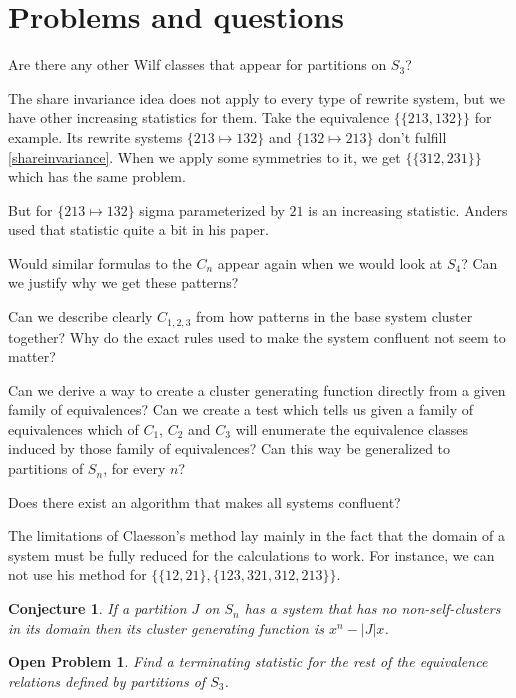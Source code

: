 \documentclass[a4paper, 11pt, english]{article}
\newcommand{\patternrule}{ \mapsto \!}
\newtheorem{openproblem}[theorem]{Open Problem}
\newtheorem{conjecture}[theorem]{Conjecture}
\theoremstyle{definition}
\newcommand{\Sym}{S}
\begin{document}
\section{Problems and questions}

Are there any other Wilf classes that appear for partitions on $\Sym_3$?

The share invariance idea does not apply to every type of rewrite system, but we
have other increasing statistics for them. Take the equivalence $\{ \{ 213, 132
\} \}$ for example. Its rewrite systems ${\{ 213 \patternrule 132 \}}$ and ${\{
132 \patternrule 213 \}}$ don't fulfill \eqref{shareinvariance}. When we
apply some symmetries to it, we get $\{ \{ 312, 231 \} \}$ which has the same
problem.

But for $\{ 213 \patternrule 132 \}$ sigma parameterized by $21$ is an
increasing statistic. Anders used that statistic quite a bit in his paper.

Would similar formulas to the $C_n$ appear again when we would
look at $\Sym_4$? Can we justify why we get these patterns?

Can we describe clearly $C_{1,2,3}$ from how patterns in the base system cluster together?
Why do the exact rules used to make the system confluent not seem to matter?

Can we derive a way to create a cluster generating function directly from a
given family of equivalences? Can we create a test which tells us given a family
of equivalences which of $C_1$, $C_2$ and $C_3$ will enumerate the equivalence
classes induced by those family of equivalences?
Can this way be generalized to partitions of $\Sym_n$, for every $n$?

Does there exist an algorithm that makes all systems confluent?

The limitations of Claesson's method lay mainly in the fact that the domain of a
system must be fully reduced for the calculations to work. For instance, we can not use his
method for $\{ \{ 12, 21 \}, \{ 123, 321, 312, 213 \} \}$.

\begin{conjecture}
    If a partition $J$ on $\Sym_n$ has a system that has no non-self-clusters in
    its domain then its cluster generating function is $x^n-|J|x$.
\end{conjecture}

\begin{openproblem}
    Find a terminating statistic for the rest of the equivalence relations
    defined by partitions of $\Sym_3$.
\end{openproblem}
\end{document}
